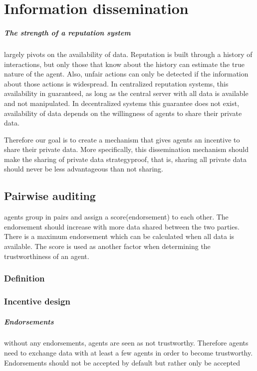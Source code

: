 \chapter{Information dissemination}

\paragraph{The strength of a reputation system} largely pivots on the availability
of data. Reputation is built through a history of interactions, but only those
that know about the history can estimate the true nature of the agent. Also, 
unfair actions can only be detected if the information about those actions is 
widespread. In centralized reputation systems, this availability in guaranteed,
as long as the central server with all data is available and not manipulated.
In decentralized systems this guarantee does not exist, availability of data
depends on the willingness of agents to share their private data.

Therefore our goal is to create a mechanism that gives agents an incentive to
share their private data. More specifically, this dissemination mechanism should
make the sharing of private data strategyproof, that is, sharing all private
data should never be less advantageous than not sharing. 

\section{Pairwise auditing}

agents group in pairs and assign a score(endorsement) to each other. The endorsement should increase
with more data shared between the two parties. There is a maximum endorsement which 
can be calculated when all data is available. The score is used as another factor
when determining the trustworthiness of an agent.

\subsection{Definition}
\subsection{Incentive design}
\paragraph{Endorsements} without any endorsements, agents are seen as not trustworthy. 
Therefore agents need to exchange data with at least a few agents in order to 
become trustworthy. Endorsements should not be accepted by default but rather
only be accepted

